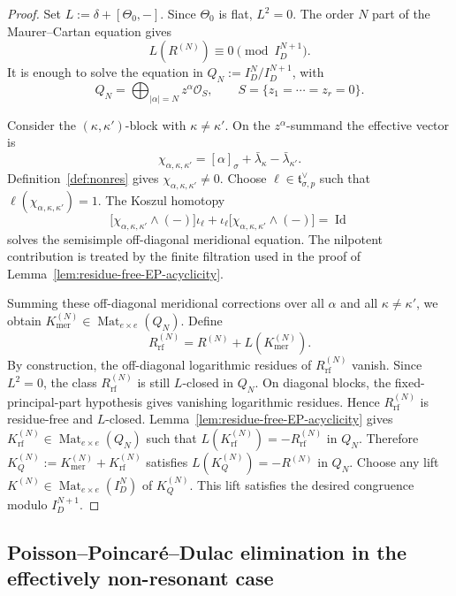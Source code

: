 \documentclass[11pt]{amsart}
\theoremstyle{plain}
\theoremstyle{definition}
\DeclareMathOperator{\Mat}{Mat}
\DeclareMathOperator{\Id}{Id}
\theoremstyle{definition}
\newcommand{\OO}{\mathcal{O}}
\begin{document}
\begin{proof}
Set $L:=\delta+[\Theta_0,-]$.  Since $\Theta_0$ is flat, $L^2=0$.  The order
$N$ part of the Maurer--Cartan equation gives
\[
        L(R^{(N)})\equiv0\pmod {I_D^{N+1}} .
\]
It is enough to solve the equation in $Q_N:=I_D^N/I_D^{N+1}$, with
\[
        Q_N=\bigoplus_{|\alpha|=N}z^\alpha\OO_S,
        \qquad
        S=\{z_1=\cdots=z_r=0\}.
\]

Consider the $(\kappa,\kappa')$-block with $\kappa\neq\kappa'$.  On the
$z^\alpha$-summand the effective vector is
\[
        \chi_{\alpha,\kappa,\kappa'}
        =
        [\alpha]_\sigma+\bar\lambda_\kappa-\bar\lambda_{\kappa'}.
\]
Definition~\ref{def:nonres} gives $\chi_{\alpha,\kappa,\kappa'}\neq0$.  Choose
$\ell\in\mathfrak t_{\sigma,p}^{\vee}$ such that
$\ell(\chi_{\alpha,\kappa,\kappa'})=1$.  The Koszul homotopy
\[
        \bigl[\chi_{\alpha,\kappa,\kappa'}\wedge(-)\bigr]\iota_\ell
        +
        \iota_\ell\bigl[\chi_{\alpha,\kappa,\kappa'}\wedge(-)\bigr]
        =
        \Id
\]
solves the semisimple off-diagonal meridional equation.  The nilpotent
contribution is treated by the finite filtration used in the proof of
Lemma~\ref{lem:residue-free-EP-acyclicity}.

Summing these off-diagonal meridional corrections over all $\alpha$ and all
$\kappa\neq\kappa'$, we obtain
$K_{\mathrm{mer}}^{(N)}\in\Mat_{e\times e}(Q_N)$.  Define
\[
        R_{\mathrm{rf}}^{(N)}=R^{(N)}+L(K_{\mathrm{mer}}^{(N)}).
\]
By construction, the off-diagonal logarithmic residues of
$R_{\mathrm{rf}}^{(N)}$ vanish.  Since $L^2=0$, the class
$R_{\mathrm{rf}}^{(N)}$ is still $L$-closed in $Q_N$.  On diagonal blocks, the
fixed-principal-part hypothesis gives vanishing logarithmic residues.  Hence
$R_{\mathrm{rf}}^{(N)}$ is residue-free and $L$-closed.
Lemma~\ref{lem:residue-free-EP-acyclicity} gives
$K_{\mathrm{rf}}^{(N)}\in\Mat_{e\times e}(Q_N)$ such that
$L(K_{\mathrm{rf}}^{(N)})=-R_{\mathrm{rf}}^{(N)}$ in $Q_N$.  Therefore
$K_Q^{(N)}:=K_{\mathrm{mer}}^{(N)}+K_{\mathrm{rf}}^{(N)}$ satisfies
$L(K_Q^{(N)})=-R^{(N)}$ in $Q_N$.  Choose any lift
$K^{(N)}\in\Mat_{e\times e}(I_D^N)$ of $K_Q^{(N)}$.  This lift satisfies the
desired congruence modulo $I_D^{N+1}$.
\end{proof}

\subsection{Poisson--Poincar\'e--Dulac elimination in the effectively non-resonant case}
\end{document}
